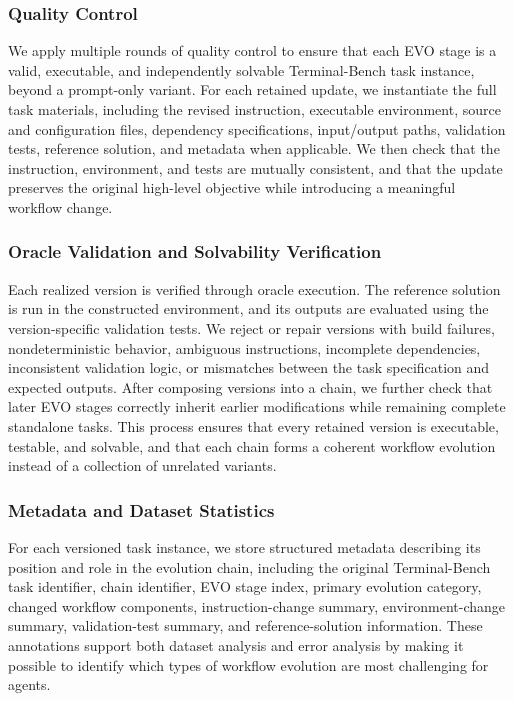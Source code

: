 \documentclass{article}
\begin{document}
\subsubsection{Quality Control}
\label{app:terminal_quality_control}
We apply multiple rounds of quality control to ensure that each EVO stage is a valid, executable, and independently solvable Terminal-Bench task instance, beyond a prompt-only variant. For each retained update, we instantiate the full task materials, including the revised instruction, executable environment, source and configuration files, dependency specifications, input/output paths, validation tests, reference solution, and metadata when applicable. We then check that the instruction, environment, and tests are mutually consistent, and that the update preserves the original high-level objective while introducing a meaningful workflow change.

\subsubsection{Oracle Validation and Solvability Verification}
\label{app:terminal_oracle_validation}
Each realized version is verified through oracle execution. The reference solution is run in the constructed environment, and its outputs are evaluated using the version-specific validation tests. We reject or repair versions with build failures, nondeterministic behavior, ambiguous instructions, incomplete dependencies, inconsistent validation logic, or mismatches between the task specification and expected outputs. After composing versions into a chain, we further check that later EVO stages correctly inherit earlier modifications while remaining complete standalone tasks. This process ensures that every retained version is executable, testable, and solvable, and that each chain forms a coherent workflow evolution instead of a collection of unrelated variants.


\subsubsection{Metadata and Dataset Statistics}
\label{app:terminal_metadata_stats}
For each versioned task instance, we store structured metadata describing its position and role in the evolution chain, including the original Terminal-Bench task identifier, chain identifier, EVO stage index, primary evolution category, changed workflow components, instruction-change summary, environment-change summary, validation-test summary, and reference-solution information. These annotations support both dataset analysis and error analysis by making it possible to identify which types of workflow evolution are most challenging for agents.
\end{document}
